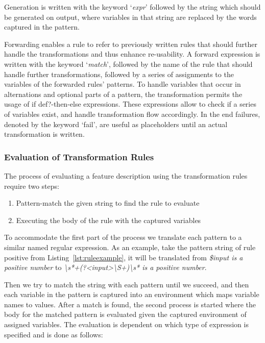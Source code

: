Generation is written with the keyword `\emph{expr}'
followed by the string which should be generated on output, where variables
in that string are replaced by the words captured in the pattern.

Forwarding enables a rule to refer to previously written rules that should further handle the
transformations and thus enhance re-usability. A forward expression is written with the keyword `\emph{match}',
followed by the name of the rule that should handle further transformations,
followed by a series of assignments to the variables of the forwarded
rules' patterns.
To handle variables that occur in alternations and optional parts of a
pattern, the transformation permits the usage of if def?-then-else expressions.
These expressions allow to check if a series of variables exist,
and handle transformation flow accordingly.
In the end failures, denoted by the keyword `fail',
are useful as placeholders until an actual transformation is written.

\subsubsection{Evaluation of Transformation Rules}
\label{sub:Evaluation of Transformation Rules}

The process of evaluating a feature description using the transformation rules require two steps:
\begin{enumerate}
  \item Pattern-match the given string to find the rule to evaluate
  \item Executing the body of the rule with the captured variables
\end{enumerate}
To accommodate the first part of the process we translate each pattern to a
similar named regular expression. As an example, take the pattern string of rule positive from Listing~\ref{lst:ruleexample}, it will be translated 
from \textit{\$input is a positive number} to \textit{\textbackslash s*+(?\textless input\textgreater\textbackslash S+)\textbackslash s* is a positive number}.

Then we try to match the string with each pattern until we succeed,
and then each variable in the pattern is captured into an environment
which maps variable names to values.
After a match is found, the second process is started where the body
for the matched pattern is evaluated given the captured environment of assigned variables.
The evaluation is dependent on which type of expression is specified
and is done as follows:

